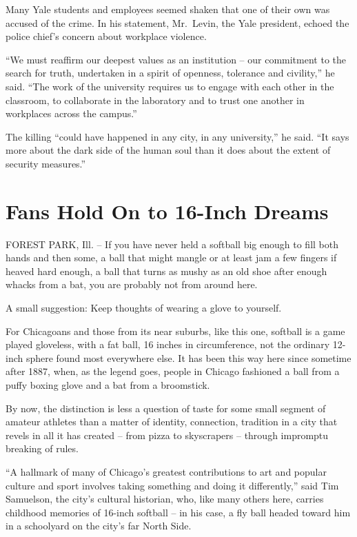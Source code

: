 ﻿\documentclass[12pt]{article}
\begin{document}
Many Yale students and employees seemed shaken that one of their own was accused of the crime. In
his statement, Mr.~Levin, the Yale president, echoed the police chief's concern about workplace
violence.

``We must reaffirm our deepest values as an institution -- our commitment to the search for truth,
undertaken in a spirit of openness, tolerance and civility,'' he said. ``The work of the university
requires us to engage with each other in the classroom, to collaborate in the laboratory and to
trust one another in workplaces across the campus.''

The killing ``could have happened in any city, in any university,'' he said. ``It says more about
the dark side of the human soul than it does about the extent of security measures.''

\section{Fans Hold On to 16-Inch Dreams}

\lettrine{F}{OREST} PARK, Ill. -- If you have never held a softball big enough to fill both hands
and then some, a ball that might mangle or at least jam a few fingers if heaved hard enough, a ball
that turns as mushy as an old shoe after enough whacks from a bat, you are probably not from around
here.

A small suggestion: Keep thoughts of wearing a glove to yourself.

For Chicagoans and those from its near suburbs, like this one, softball is a game played gloveless,
with a fat ball, 16 inches in circumference, not the ordinary 12-inch sphere found most everywhere
else. It has been this way here since sometime after 1887, when, as the legend goes, people in
Chicago fashioned a ball from a puffy boxing glove and a bat from a broomstick.

By now, the distinction is less a question of taste for some small segment of amateur athletes than
a matter of identity, connection, tradition in a city that revels in all it has created -- from
pizza to skyscrapers -- through impromptu breaking of rules.

``A hallmark of many of Chicago's greatest contributions to art and popular culture and sport
involves taking something and doing it differently,'' said Tim Samuelson, the city's cultural
historian, who, like many others here, carries childhood memories of 16-inch softball -- in his
case, a fly ball headed toward him in a schoolyard on the city's far North Side.
\end{document}
